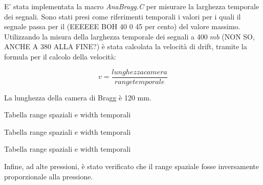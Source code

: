 E' stata implementata la macro \textit{AnaBragg.C} per misurare la larghezza temporale dei segnali. Sono stati presi come riferimenti temporali i valori per i quali il segnale
passa per il (EEEEEE BOH 40 0 45 per cento) del valore massimo. Utilizzando la misura della larghezza temporale dei segnali a 400 $mb$ (NON SO, ANCHE A 380 ALLA FINE?) è stata calcolata la velocità di drift, 
tramite la formula per il calcolo della velocità:

$$ v=\frac{lunghezza camera}{range temporale} $$

La lunghezza della camera di Bragg è 120 mm.
\begin{tabella}
 \centering
  
 \caption{Tabella range spaziali e width temporali}
 \label{tab:range_picco1.tex}
\end{tabella}

\begin{tabella}
 \centering
  
 \caption{Tabella range spaziali e width temporali}
 \label{tab:range_picco2.tex}
\end{tabella}

\begin{tabella}
 \centering
  
 \caption{Tabella range spaziali e width temporali}
 \label{tab:range_picco3.tex}
\end{tabella}

Infine, ad alte pressioni, è stato verificato che il range spaziale fosse inversamente proporzionale alla pressione.